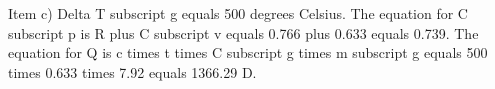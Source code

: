 Item c) Delta T subscript g equals 500 degrees Celsius. The equation for C subscript p is R plus C subscript v equals 0.766 plus 0.633 equals 0.739. The equation for Q is c times t times C subscript g times m subscript g equals 500 times 0.633 times 7.92 equals 1366.29 D.